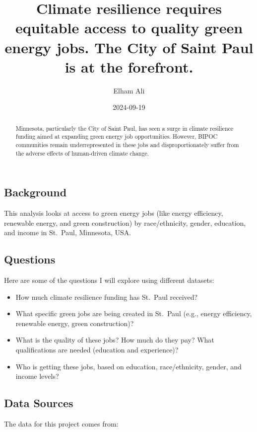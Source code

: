 \documentclass[
  letterpaper,
  DIV=11,
  numbers=noendperiod]{scrartcl}
\title{Climate resilience requires equitable access to quality green
energy jobs. The City of Saint Paul is at the forefront.}
\author{Elham Ali}
\date{2024-09-19}
\providecommand{\tightlist}{%
  \setlength{\itemsep}{0pt}\setlength{\parskip}{0pt}}\usepackage{longtable,booktabs,array}
\begin{document}
\maketitle
\begin{abstract}
Minnesota, particularly the City of Saint Paul, has seen a surge in
climate resilience funding aimed at expanding green energy job
opportunities. However, BIPOC communities remain underrepresented in
these jobs and disproportionately suffer from the adverse effects of
human-driven climate change.
\end{abstract}

\subsection{Background}\label{background}

This analysis looks at access to green energy jobs (like energy
efficiency, renewable energy, and green construction) by race/ethnicity,
gender, education, and income in St.~Paul, Minnesota, USA.

\subsection{Questions}\label{questions}

Here are some of the questions I will explore using different datasets:

\begin{itemize}
\tightlist
\item
  How much climate resilience funding has St.~Paul received?
\item
  What specific green jobs are being created in St.~Paul (e.g., energy
  efficiency, renewable energy, green construction)?
\item
  What is the quality of these jobs? How much do they pay? What
  qualifications are needed (education and experience)?
\item
  Who is getting these jobs, based on education, race/ethnicity, gender,
  and income levels?
\end{itemize}

\subsection{Data Sources}\label{data-sources}

The data for this project comes from:
\end{document}
